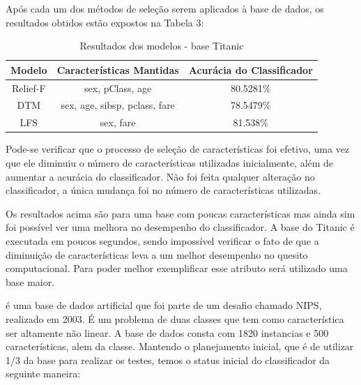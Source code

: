 Após cada um dos métodos de seleção serem aplicados à base de dados, os resultados obtidos estão expostos na Tabela 3:

\begin{table}[H]
\centering
\caption{Resultados dos modelos - base Titanic}
\label{my-label}
\begin{tabular}{|c|c|c|}
\hline
\multicolumn{1}{|l|}{\textbf{Modelo}} & \textbf{Características Mantidas} & \multicolumn{1}{l|}{\textbf{Acurácia do Classificador}} \\ \hline
Relief-F                              & sex, pClass, age                  & 80.5281\%                                            \\ \hline
DTM                                   & sex, age, sibsp, pclass, fare     & 78.5479\%                                            \\ \hline
LFS                                   & sex, fare                         & 81.538\%                                             \\ \hline
\end{tabular}
\end{table}

Pode-se verificar que o processo de seleção de características foi efetivo, uma vez que ele diminuiu o número de características utilizadas inicialmente, além de aumentar a acurácia do classificador. Não foi feita qualquer alteração no classificador, a única mudança foi no número de características utilizadas.

Os resultados acima são para uma base com poucas características mas ainda sim foi possível ver uma melhora no desempenho do classificador. A base do Titanic é executada em poucos segundos, sendo impossível verificar o fato de que a diminuição de características leva a um melhor desempenho no quesito computacional. Para poder melhor exemplificar esse atributo será utilizado uma base maior. 

 é uma base de dados artificial que foi parte de um desafio chamado NIPS, realizado em 2003. É um problema de duas classes que tem como característica ser altamente não linear. A base de dados consta com 1820 instancias e 500 características, alem da classe. Mantendo o planejamento inicial, que é de utilizar 1/3 da base para realizar os testes, temos o status inicial do classificador da seguinte maneira:

